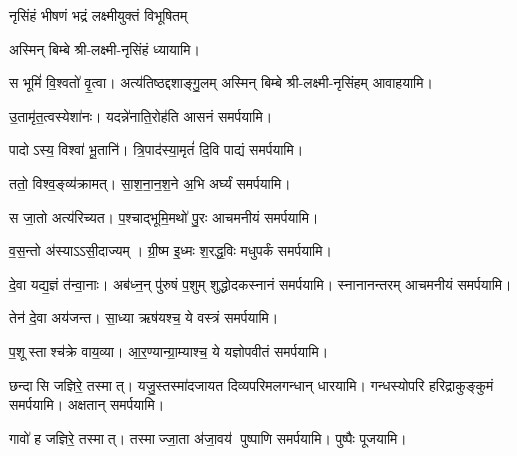 \begin{center}


{नृसिंहं भीषणं भद्रं लक्ष्मीयुक्तं विभूषितम्}

अस्मिन् बिम्बे श्री-लक्ष्मी-नृसिंहं ध्यायामि।
\medskip

{स भूमिं॑ वि॒श्वतो॑ वृ॒त्वा। अत्य॑तिष्ठद्दशाङ्गु॒लम्}
अस्मिन् बिम्बे श्री-लक्ष्मी-नृसिंहम् आवाहयामि।
\medskip

 {उ॒तामृ॑त॒त्वस्येशा॑नः। यदन्ने॑नाति॒रोह॑ति}
 आसनं समर्पयामि।\medskip

{पादोऽस्य॒ विश्वा॑ भू॒तानि॑। त्रि॒पाद॑स्या॒मृतं॑ दि॒वि}
 पाद्यं समर्पयामि।\medskip
 
{ततो॒ विश्व॒ङ्व्य॑क्रामत्। सा॒श॒ना॒न॒श॒ने अ॒भि}
 अर्घ्यं समर्पयामि।\medskip

{स जा॒तो अत्य॑रिच्यत। प॒श्चाद्भूमि॒मथो॑ पु॒रः}
 आचमनीयं समर्पयामि।\medskip

{व॒स॒न्तो अ॑स्याऽऽसी॒दाज्यम्। ग्री॒ष्म इ॒ध्मः श॒रद्ध॒विः}
मधुपर्कं समर्पयामि।\medskip

 {दे॒वा यद्य॒ज्ञं त॑न्वा॒नाः। अब॑ध्न॒न् पु॑रुषं प॒शुम्}
 शुद्धोदकस्नानं समर्पयामि। स्नानानन्तरम् आचमनीयं समर्पयामि।\medskip

 {तेन॑ दे॒वा अय॑जन्त। सा॒ध्या ऋष॑यश्च॒ ये}
 वस्त्रं समर्पयामि।\medskip

{प॒शूस्ताश्च॑क्रे वाय॒व्या\sn{}। आ॒र॒ण्यान्ग्रा॒म्याश्च॒ ये}
 यज्ञोपवीतं समर्पयामि।\medskip

{छन्दासि जज्ञिरे॒ तस्मात्। यजु॒स्तस्मा॑दजायत}
 दिव्यपरिमलगन्धान् धारयामि। गन्धस्योपरि हरिद्राकुङ्कुमं समर्पयामि। अक्षतान् समर्पयामि।\medskip

{गावो॑ ह जज्ञिरे॒ तस्मात्। तस्माज्जा॒ता अ॑जा॒वय॑}
 पुष्पाणि समर्पयामि।  पुष्पैः पूजयामि।


\end{center}
